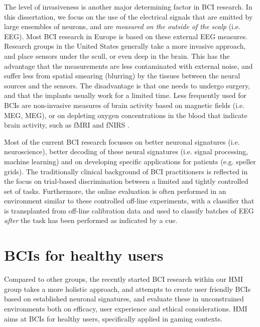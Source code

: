 The level of invasiveness is another major determining factor in \ac{BCI}
research. In this dissertation, we focus on the use of the electrical signals
that are emitted by large ensembles of neurons, and are \emph{measured on the
outside of the scalp} (i.e. \ac{EEG}). Most \ac{BCI} research in Europe is
based on these external \ac{EEG} measures. Research groups in the United States
generally take a more invasive approach, and place sensors under the scull, or
even deep in the brain. This has the advantage that the measurements are less
contaminated with external noise, and suffer less from spatial smearing
(blurring) by the tissues between the neural sources and the sensors. The
disadvantage is that one needs to undergo surgery, and that the implants
usually work for a limited time. 
%
Less frequently used for \acp{BCI} are non-invasive measures of brain activity
based on magnetic fields (i.e. \acl{MEG}, \acs{MEG}), or on depleting oxygen
concentrations in the blood that indicate brain activity, such as \ac{fMRI} and
\ac{fNIRS} \cite{wolpaw2006bm2}. 

Most of the current \ac{BCI} research focusses on better neuronal signatures
(i.e. neuroscience), better decoding of these neural signatures (i.e. signal
processing, machine learning) and on developing specific applications for
patients (e.g. speller grids). The traditionally clinical background of
\ac{BCI} practitioners is reflected in the focus on trial-based discrimination
between a limited and tightly controlled set of tasks. Furthermore, the online
evaluation is often performed in an environment similar to these controlled
off-line experiments, with a classifier that is transplanted from off-line
calibration data and used to classify batches of \ac{EEG} \emph{after} the task
has been performed as indicated by a cue.

\section{BCIs for healthy users}
\begin{sloppypar}
Compared to other groups, the recently started \ac{BCI} research within our
\ac{HMI} group takes a more holistic approach, and attempts to create user
friendly \acp{BCI} based on established neuronal signatures, and evaluate these
in unconstrained environments both on efficacy, user experience and ethical
considerations. \Ac{HMI} aims at \acp{BCI} for healthy users, specifically
applied in gaming contexts. \end{sloppypar}

